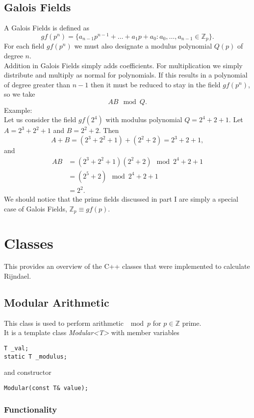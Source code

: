 \documentclass{article}
\begin{document}
\subsection{Galois Fields}

A Galois Fields is defined as
\[  gf(p^n) = \{a_{n-1}p^{n-1}+\ldots+a_{1}p+a_0 : a_0,\ldots,a_{n-1}\in\mathbb{Z}_p \}. \]
For each field $ gf(p^n)$ we must also designate a modulus polynomial $Q(p)$ of degree $n$.\\
Addition in Galois Fields simply adds coefficients.  For multiplication we simply distribute and multiply as normal for polynomials.  If this results in a polynomial of degree greater than $n-1$ then it must be reduced to stay in the field $ gf(p^n)$, so we take
\[ AB \mod Q. \]
Example:\\
Let us consider the field $ gf(2^4)$ with modulus polynomial $Q = 2^4+2+1$. Let $A = 2^3+2^2+1$ and $B = 2^2+2$.  Then
\[ A + B = (2^3+2^2+1)+(2^2+2) = 2^3 + 2 + 1, \]
and
\begin{align*}
AB &= (2^3+2^2+1)(2^2+2) \mod 2^4+2+1\\
&= (2^5 + 2) \mod 2^4+2+1\\
&= 2^2.
\end{align*}
We should notice that the prime fields discussed in part I are simply a special case of Galois Fields, $\mathbb{Z}_p \equiv gf(p)$.

\section{Classes}

This provides an overview of the C++ classes that were implemented to calculate Rijndael.

\subsection{Modular Arithmetic}

This class is used to perform arithmetic $\mod p$ for $p\in\mathbb{Z}$ prime.\\
It is a template class {\it Modular<T>} with member variables
\begin{lstlisting}
T _val;
static T _modulus;
\end{lstlisting}
and constructor
\begin{lstlisting}
Modular(const T& value);
\end{lstlisting}

\subsubsection{Functionality}
\end{document}

